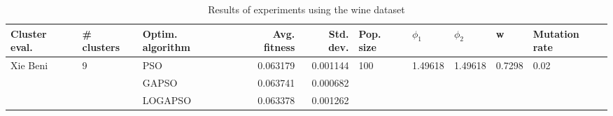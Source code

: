\begin{table}
\centering
\caption{Results of experiments using the wine dataset}
\begin{tabular}{lllrrlllll}
\toprule
            Cluster eval. &        \# clusters & Optim. algorithm &  Avg. fitness &  Std. dev. &            Pop. size &               $\phi_{1}$ &               $\phi_{2}$ &                       w &         Mutation rate \\
\midrule
\multirow{3}{*}{Xie Beni} & \multirow{3}{*}{9} &              PSO &      0.063179 &   0.001144 & \multirow{3}{*}{100} & \multirow{3}{*}{1.49618} & \multirow{3}{*}{1.49618} & \multirow{3}{*}{0.7298} & \multirow{3}{*}{0.02} \\
                          &                    &            GAPSO &      0.063741 &   0.000682 &                      &                          &                          &                         &                       \\
                          &                    &          LOGAPSO &      0.063378 &   0.001262 &                      &                          &                          &                         &                       \\
\bottomrule
\end{tabular}
\end{table}
